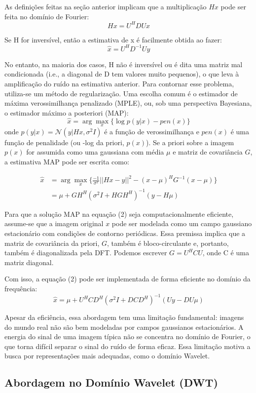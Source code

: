 \documentclass[12pt]{article}
\begin{document}
As definições feitas na seção anterior implicam que a multiplicação $Hx$ pode ser feita no domínio de Fourier:
\[
Hx = U^HDUx
\]

Se H for inversível, então a estimativa de x é facilmente obtida ao fazer:
\[
\hat{x} = U^HD^{-1}Uy
\]

No entanto, na maioria dos casos, H não é inversível ou é dita uma matriz mal condicionada (i.e., a diagonal de D tem valores muito pequenos), o que leva à amplificação do ruído na estimativa anterior.
Para contornar esse problema, utiliza-se um método de regularização. Uma escolha comum é o estimador de máxima verossimilhança penalizado (MPLE), ou, sob uma perspectiva Bayesiana, o estimador máximo a posteriori (MAP):
\[
\hat{x} = \arg \max_{x} \{\log{p(y|x)} - pen(x)\}
\]
onde $p(y|x) = \mathcal{N}(y|Hx, \sigma^2I)$ é a função de verossimilhança e $pen(x)$ é uma função de penalidade (ou -log da priori, $p(x)$). 
Se a priori sobre a imagem $p(x)$ for assumida como uma gaussiana com média $\mu$ e matriz de covariância $G$, a estimativa MAP pode ser escrita como:

\begin{align}
\hat{x} &= \arg \max_{x} \{\frac{-1}{\sigma^2}||Hx - y||^2 - (x - \mu)^HG^{-1}(x-\mu)  \}\\
        &= \mu + GH^H (\sigma^2I + HGH^H)^{-1} (y-H\mu)   
\end{align}

Para que a solução MAP na equação (2) seja computacionalmente eficiente, assume-se que a imagem original $x$ pode ser modelada como um campo gaussiano estacionário com condições de contorno periódicas. Essa premissa implica que a matriz de covariância da priori, $G$, também é bloco-circulante e, portanto, também é diagonalizada pela DFT. Podemos escrever $G = U^H C U$, onde C é uma matriz diagonal.

Com isso, a equação (2) pode ser implementada de forma eficiente no domínio da frequência:
\[
\hat{x} = \mu + U^H C D^H (\sigma^2I + DCD^H)^{-1} (Uy - DU\mu)
\]

Apesar da eficiência, essa abordagem tem uma limitação fundamental: imagens do mundo real não são bem modeladas por campos gaussianos estacionários. A energia do sinal de uma imagem típica não se concentra no domínio de Fourier, o que torna difícil separar o sinal do ruído de forma eficaz. Essa limitação motiva a busca por representações mais adequadas, como o domínio Wavelet.


\subsection{Abordagem no Domínio Wavelet (DWT)}
\end{document}
